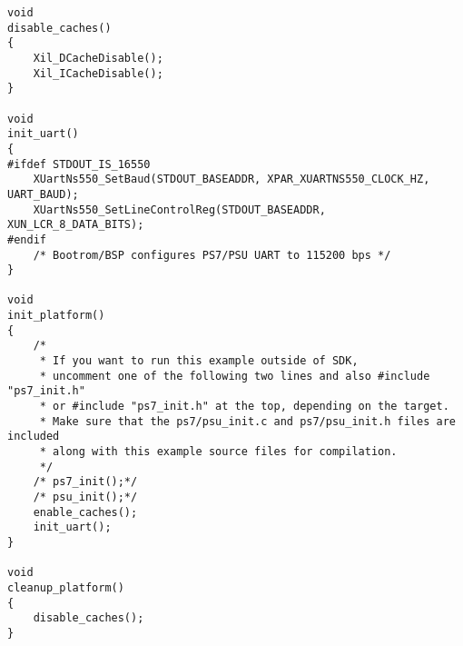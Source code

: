 \begin{lstlisting}
void
disable_caches()
{
    Xil_DCacheDisable();
    Xil_ICacheDisable();
}

void
init_uart()
{
#ifdef STDOUT_IS_16550
    XUartNs550_SetBaud(STDOUT_BASEADDR, XPAR_XUARTNS550_CLOCK_HZ, UART_BAUD);
    XUartNs550_SetLineControlReg(STDOUT_BASEADDR, XUN_LCR_8_DATA_BITS);
#endif
    /* Bootrom/BSP configures PS7/PSU UART to 115200 bps */
}

void
init_platform()
{
    /*
     * If you want to run this example outside of SDK,
     * uncomment one of the following two lines and also #include "ps7_init.h"
     * or #include "ps7_init.h" at the top, depending on the target.
     * Make sure that the ps7/psu_init.c and ps7/psu_init.h files are included
     * along with this example source files for compilation.
     */
    /* ps7_init();*/
    /* psu_init();*/
    enable_caches();
    init_uart();
}

void
cleanup_platform()
{
    disable_caches();
}
\end{lstlisting}





